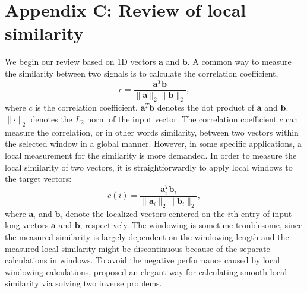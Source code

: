 \section{Appendix C: Review of local similarity}
We begin our review based on 1D vectors $\mathbf{a}$ and $\mathbf{b}$. A common way to measure the similarity between two signals is to calculate the correlation coefficient,
\begin{equation}
\label{eq:corr}
c=\frac{\mathbf{a}^T\mathbf{b}}{\parallel \mathbf{a} \parallel_2 \parallel \mathbf{b} \parallel_2},
\end{equation}
where $c$ is the correlation coefficient, $\mathbf{a}^T\mathbf{b}$ denotes the dot product of $\mathbf{a}$ and $\mathbf{b}$. $\parallel \cdot \parallel_2$ denotes the $L_2$ norm of the input vector. The correlation coefficient $c$ can measure the correlation, or in other words similarity, between two vectors within the selected window in a global manner. However, in some specific applications, a local measurement for the similarity is more demanded. In order to 
measure the local similarity of two vectors, it is straightforwardly to apply local windows to the target vectors: 
\begin{equation}
\label{eq:localcorr}
c(i) =  \frac{\mathbf{a}_i^T\mathbf{b}_i}{\parallel \mathbf{a}_i \parallel_2 \parallel \mathbf{b}_i \parallel_2},
\end{equation}
where $\mathbf{a}_i$ and $\mathbf{b}_i$ denote the localized vectors centered on the $i$th entry of input long vectors $\mathbf{a}$ and $\mathbf{b}$, respectively. The windowing is sometime troublesome, since the measured similarity is largely dependent on the windowing length and the measured local similarity might be discontinuous because of the separate calculations in windows. To avoid the negative performance caused by local windowing calculations, \cite{fomel2007localattr} proposed an elegant way for calculating smooth local similarity via solving two inverse problems. 

